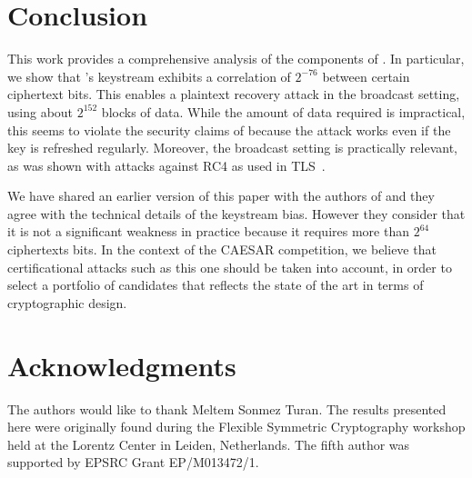 
\section{Conclusion}
\label{sec/Conclusion}

This work provides a comprehensive analysis of the components of
\MORUS.  In particular, we show that \MORUS[1280]'s keystream exhibits a correlation of $2^{-76}$ between certain ciphertext bits. This enables a plaintext recovery
attack in the broadcast setting, using about $2^{152}$ blocks of data.
While the amount of data required is impractical, this seems to
violate the security claims of \MORUS[1280] because the attack works
even if the key is refreshed regularly.  Moreover, the broadcast
setting is practically relevant, as was shown with attacks against RC4
as used in TLS~\cite{DBLP:conf/uss/AlFardanBPPS13}.

We have shared an earlier version of this paper with the authors of
\MORUS and they agree with the technical details of the keystream
bias.  However they consider that it is not a significant weakness in
practice because it requires more than $2^{64}$ ciphertexts bits.  In
the context of the CAESAR competition, we believe that certificational
attacks such as this one should be taken into account, in order to
select a portfolio of candidates that reflects the state of the art in
terms of cryptographic design.

\ifanonymous
\else
\section{Acknowledgments}

The authors would like to thank Meltem Sonmez Turan. The results presented here were originally found during the Flexible Symmetric Cryptography workshop held at the Lorentz Center in Leiden, Netherlands. The fifth author was supported by EPSRC Grant EP/M013472/1.

\fi

\FloatBarrier

